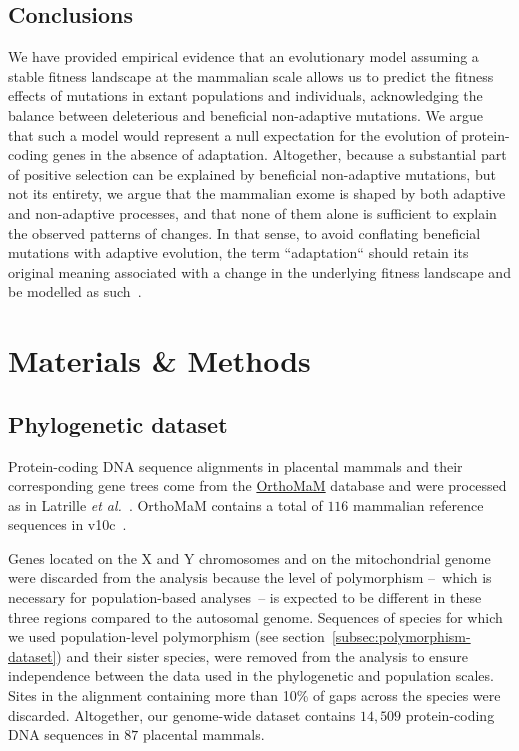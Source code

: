 \documentclass[10pt,letterpaper]{article}
\begin{document}
\subsection*{Conclusions}

We have provided empirical evidence that an evolutionary model assuming a stable fitness landscape at the mammalian scale allows us to predict the fitness effects of mutations in extant populations and individuals, acknowledging the balance between deleterious and beneficial non-adaptive mutations.
We argue that such a model would represent a null expectation for the evolution of protein-coding genes in the absence of adaptation.
Altogether, because a substantial part of positive selection can be explained by beneficial non-adaptive mutations, but not its entirety, we argue that the mammalian exome is shaped by both adaptive and non-adaptive processes, and that none of them alone is sufficient to explain the observed patterns of changes.
In that sense, to avoid conflating beneficial mutations with adaptive evolution, the term ``adaptation`` should retain its original meaning associated with a change in the underlying fitness landscape and be modelled as such~\cite{mustonen_fitness_2009, mustonen_fitness_2010}.

\newpage
\section{Materials \& Methods}
\label{sec:methods}

\subsection{Phylogenetic dataset}\label{subsec:phylo-dataset}

Protein-coding DNA sequence alignments in placental mammals and their corresponding gene trees come from the \href{https://www.orthomam.univ-montp2.fr}{OrthoMaM} database and were processed as in Latrille \textit{et al.}~\cite{latrille_genes_2023}.
OrthoMaM contains a total of $116$ mammalian reference sequences in v10c~\cite{ranwez_orthomam_2007, douzery_orthomam_2014, scornavacca_orthomam_2019}.

Genes located on the X and Y chromosomes and on the mitochondrial genome were discarded from the analysis because the level of polymorphism –~which is necessary for population-based analyses~– is expected to be different in these three regions compared to the autosomal genome.
Sequences of species for which we used population-level polymorphism (see section~\ref{subsec:polymorphism-dataset}) and their sister species, were removed from the analysis to ensure independence between the data used in the phylogenetic and population scales.
Sites in the alignment containing more than 10\% of gaps across the species were discarded.
Altogether, our genome-wide dataset contains $14,509$ protein-coding DNA sequences in $87$ placental mammals.
\end{document}
